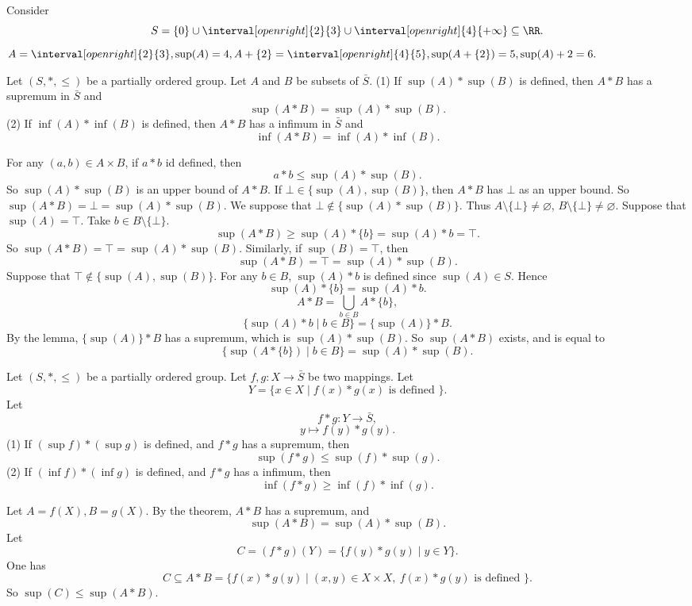 \begin{remark}
    Consider
    $$S=\{0\}\cup\interval[open right]{2}{3}\cup\interval[open right ]{4}{+\infty}\subseteq \RR.$$ 
    $A=\interval[open right]{2}{3}, \sup(A)=4, A+\{2\}=\interval[open right]{4}{5}, \sup(A+\{2\})=5, \sup(A)+2=6.$
\end{remark}
\begin{theoremenv}
    Let $(S,*,\le)$ be a partially ordered group. Let $A$ and $B$ be subsets of $\bar{S}$.
    \newline
    (1) If $\sup(A)*\sup(B)$ is defined, then $A*B$ has a supremum in $\bar{S}$ and
    $$\sup(A*B)=\sup(A)*\sup(B).$$
    (2) If $\inf(A)*\inf(B)$ is defined, then $A*B$ has a infimum in $\bar{S}$ and
    $$\inf(A*B)=\inf(A)*\inf(B).$$
\end{theoremenv}
\begin{proofenv}
    For any $(a,b)\in A\times B$, if $a*b$ id defined, then 
    $$a*b\le \sup(A)*\sup(B).$$
    So $\sup(A)*\sup(B)$ is an upper bound of $A*B$. If $\bot\in \{\sup(A),\sup(B)\}$, then $A*B$ has $\bot$ as an upper bound. So $\sup(A*B)=\bot=\sup(A)*\sup(B)$. We suppose that $\bot\notin \{\sup(A)*\sup(B)\}$. Thus $A\setminus\{\bot\}\not=\varnothing$, $B\setminus\{\bot\}\not=\varnothing$. Suppose that $\sup(A)=\top$. Take $b\in B\setminus\{\bot\}$.
    \[\sup(A*B)\ge\sup(A)*\{b\}=\sup(A)*b=\top.\]
    So $\sup(A*B)=\top=\sup(A)*\sup(B)$. Similarly, if $\sup(B)=\top$, then 
    $$\sup(A*B)=\top=\sup(A)*\sup(B).$$
    Suppose that $\top\notin\{\sup (A),\sup (B)\}$. For any $b\in B$, $\sup(A)*b$ is defined since $\sup(A)\in S$. Hence
    $$\sup(A)*\{b\}=\sup(A)*b.$$
    $$A*B=\bigcup_{b\in B}A*\{b\},$$
    $$\{\sup(A)*b\mid b\in B\}=\{\sup(A)\}*B.$$
    By the lemma, $\{\sup(A)\}*B$ has a supremum, which is $\sup(A)*\sup(B)$. So $\sup(A*B)$ exists, and is equal to 
    $$\{\sup(A*\{b\})\mid b\in B\}=\sup(A)*\sup(B).$$
\end{proofenv}
\begin{corollaryenv}
    Let $(S,*,\le)$ be a partially ordered group. Let $f,g: X\longrightarrow \bar{S}$ be two mappings. Let 
    $$Y=\{x\in X\mid f(x)*g(x) \text{ is defined }\}.$$
    Let $$f*g: Y\longrightarrow \bar{S},$$
    $$y\longmapsto f(y)*g(y).$$
    (1) If $(\sup f)*(\sup g)$ is defined, and $f*g$ has a supremum, then $$\sup(f*g)\le \sup(f)*\sup(g).$$
    (2) If $(\inf f)*(\inf g)$ is defined, and $f*g$ has a infimum, then $$\inf(f*g)\ge \inf(f)*\inf(g).$$
\end{corollaryenv}
\begin{proofenv}
    Let $A=f(X), B=g(X)$. By the theorem, $A*B$ has a supremum, and 
    $$\sup(A*B)=\sup(A)*\sup(B).$$
    Let $$C=(f*g)(Y)=\{f(y)*g(y)\mid y\in Y\}.$$
    One has 
    $$C\subseteq A*B=\{f(x)*g(y)\mid (x,y)\in X\times X,\  f(x)*g(y)\text{ is defined }\}.$$
    So $\sup(C)\le \sup(A*B).$
\end{proofenv}
